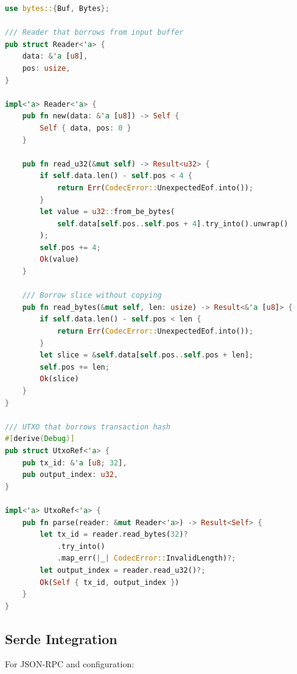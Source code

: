 \documentclass[11pt,twocolumn]{article}
\begin{document}
\begin{lstlisting}[language=Rust,caption=Zero-Copy Codec]
use bytes::{Buf, Bytes};

/// Reader that borrows from input buffer
pub struct Reader<'a> {
    data: &'a [u8],
    pos: usize,
}

impl<'a> Reader<'a> {
    pub fn new(data: &'a [u8]) -> Self {
        Self { data, pos: 0 }
    }

    pub fn read_u32(&mut self) -> Result<u32> {
        if self.data.len() - self.pos < 4 {
            return Err(CodecError::UnexpectedEof.into());
        }
        let value = u32::from_be_bytes(
            self.data[self.pos..self.pos + 4].try_into().unwrap()
        );
        self.pos += 4;
        Ok(value)
    }

    /// Borrow slice without copying
    pub fn read_bytes(&mut self, len: usize) -> Result<&'a [u8]> {
        if self.data.len() - self.pos < len {
            return Err(CodecError::UnexpectedEof.into());
        }
        let slice = &self.data[self.pos..self.pos + len];
        self.pos += len;
        Ok(slice)
    }
}

/// UTXO that borrows transaction hash
#[derive(Debug)]
pub struct UtxoRef<'a> {
    pub tx_id: &'a [u8; 32],
    pub output_index: u32,
}

impl<'a> UtxoRef<'a> {
    pub fn parse(reader: &mut Reader<'a>) -> Result<Self> {
        let tx_id = reader.read_bytes(32)?
            .try_into()
            .map_err(|_| CodecError::InvalidLength)?;
        let output_index = reader.read_u32()?;
        Ok(Self { tx_id, output_index })
    }
}
\end{lstlisting}

\subsection{Serde Integration}

For JSON-RPC and configuration:
\end{document}

